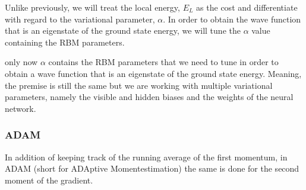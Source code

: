 Unlike previously, we will treat the local energy, $E_L$ as the cost and differentiate with regard to the variational parameter, $\alpha$. In order to obtain the wave function that is an eigenstate of the ground state energy, we will tune the $\alpha$ value containing the RBM parameters. 

 only now $α$ contains the RBM parameters that we need to tune in order to obtain a wave function that is an eigenstate of the ground state energy.  Meaning, the premise is still the same  but  we  are  working  with  multiple  variational parameters, namely the visible and hidden biases and the weights of the neural network.

\subsubsection{ADAM}
In addition of keeping track of the running average of the first momentum, in ADAM (short for ADAptive Momentestimation) the same is done for the second moment of the gradient. 